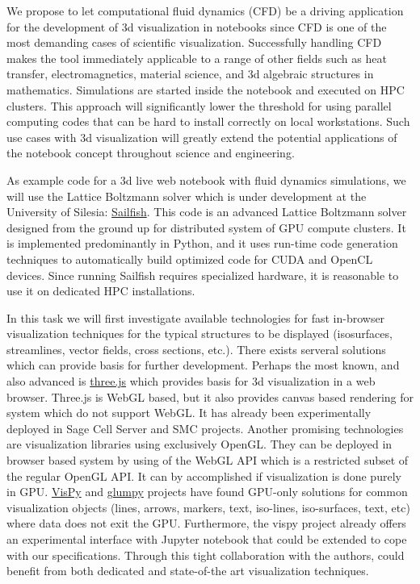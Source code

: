 \begin{workpackage}
\begin{tasklist}
\begin{task}[title=Visualization system for 3d data in web-notebook
, id=cfd-vis,lead=SR, partners={US,PS,USO}]
We propose to let computational fluid dynamics (CFD) be a driving
application for the development of 3d visualization in \Jupyter
notebooks since CFD is one of the most demanding cases of scientific
visualization. Successfully handling CFD makes the tool immediately
applicable to a range of other fields such as heat transfer,
electromagnetics, material science, and 3d algebraic structures in
mathematics. Simulations are started inside the notebook and executed
on HPC clusters. This approach will significantly lower the threshold
for using parallel computing codes that can be hard to install
correctly on local workstations. Such use cases with 3d visualization
will greatly extend the potential applications of the \Jupyter
notebook concept throughout science and engineering.

As example code for a 3d live web notebook with fluid dynamics
simulations, we will use the Lattice Boltzmann solver which is under
development at the University of Silesia:
\href{http://sailfish.us.edu.pl/}{Sailfish}.  This code is an advanced
Lattice Boltzmann solver designed from the ground up for distributed
system of GPU compute clusters. It is implemented predominantly in
Python, and it uses run-time code generation techniques to
automatically build optimized code for CUDA and OpenCL devices. Since
running Sailfish requires specialized hardware, it is reasonable to
use it on dedicated HPC installations.

In this task we will first investigate available technologies for fast
in-browser visualization techniques for the typical structures to be
displayed (isosurfaces, streamlines, vector fields, cross sections,
etc.).  There exists serveral solutions which can provide basis for
further development. Perhaps the most known, and also advanced is
\href{http://threejs.org/}{three.js} which provides basis for 3d
visualization in a web browser. Three.js is WebGL based, but it also
provides canvas based rendering for system which do not support
WebGL. It has already been experimentally deployed in Sage Cell Server
and SMC projects. Another promising technologies are visualization
libraries using exclusively OpenGL. They can be deployed in browser based
system by using of the WebGL API which is a restricted subset of the
regular OpenGL API. It can by accomplished if visualization is done
purely in GPU. \href{http://vispy.org/}{VisPy} and
\href{http://glumpy.github.io/}{glumpy} projects have found GPU-only
solutions for common visualization objects (lines, arrows, markers,
text, iso-lines, iso-surfaces, text, etc) where data does not exit the
GPU. Furthermore, the vispy project already offers an experimental
interface with Jupyter notebook that could be extended to cope with
our specifications. Through this tight collaboration with the authors,
\TheProject could benefit from both dedicated and state-of-the art
visualization techniques.


\end{task}
\end{tasklist}
\end{workpackage}
